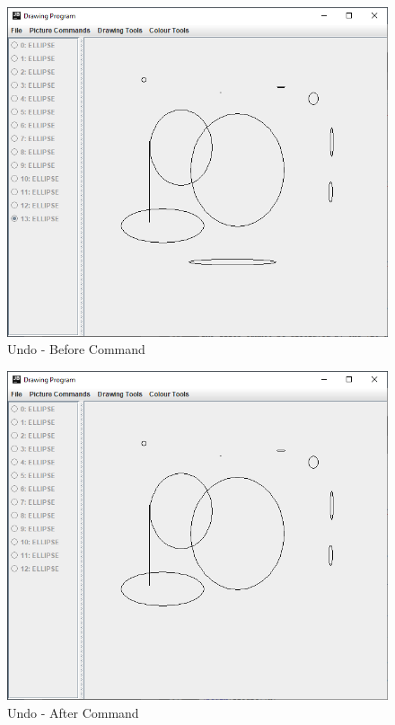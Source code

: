 \documentclass[12pt]{article} %
\begin{document}
\begin{figure}[H]
\caption{Undo - Before Command}
\centering
\includegraphics[scale=0.75]{pictures/undoFirstWindow.PNG}
\end{figure}

\begin{figure}[H]
\caption{Undo - After Command}
\centering
\includegraphics[scale=0.75]{pictures/undoSecondWindow.PNG}
\end{figure}
\end{document}
